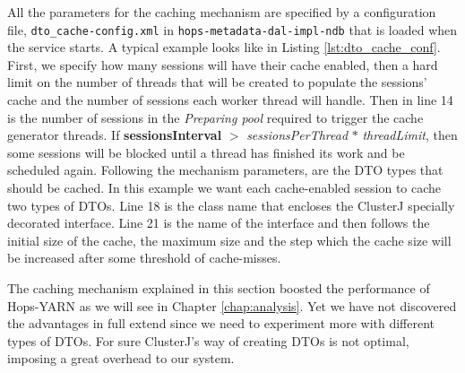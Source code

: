 

All the parameters for the caching mechanism are specified by a
configuration file, \texttt{dto\_cache-config.xml} in
\texttt{hops-metadata-dal-impl-ndb} that is loaded when
the service starts. A typical example looks like in Listing
\ref{lst:dto_cache_conf}. First, we specify how many sessions
will have their cache enabled, then a hard limit on the number
of threads that will be created to populate the sessions' cache and
the number of sessions each worker thread will handle. Then in line 14
is the number of sessions in the \emph{Preparing pool} required to
trigger the cache generator threads. If \textbf{sessionsInterval}
$>$ \emph{sessionsPerThread} $*$ \emph{threadLimit}, then some
sessions will be blocked until a thread has finished its work and be
scheduled again. Following the mechanism parameters, are the DTO types
that should be cached. In this example we want each cache-enabled
session to cache two types of DTOs. Line 18 is the class name that
encloses the ClusterJ specially decorated interface. Line 21 is the
name of the interface and then follows the initial size of the cache,
the maximum size and the step which the cache size will be increased after some
threshold of cache-misses.

The caching mechanism explained in this section boosted the
performance of Hops-YARN as we will see in Chapter \ref{chap:analysis}. Yet
we have not discovered the advantages in full extend since we need to
experiment more with different types of DTOs. For sure ClusterJ's way
of creating DTOs is not optimal, imposing a great overhead to our system.